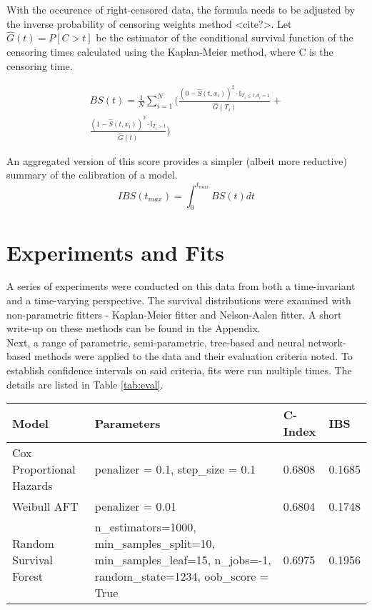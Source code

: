 \documentclass[%
 reprint,
 amsmath,amssymb,
 aps,
]{revtex4-2}
\begin{document}
With the occurence of right-censored data, the formula needs to be adjusted by the inverse probability of censoring weights method <cite?>. Let $\hat{G}(t) = P[C>t]$ be the estimator of the conditional survival function of the censoring times calculated using the Kaplan-Meier method, where C is the censoring time.

\begin{gather*}
BS(t) = \frac{1}{N}\sum^{N}_{i=1}\Bigg(\frac{(0-\hat{S}(t,x_i))^2 \cdot \mathbb{I}_{T_i\le t, d_i = 1}}{\hat{G}(T_i)} +\\
\frac{(1-\hat{S}(t,x_i))^2 \cdot \mathbb{I}_{T_i > t}}{\hat{G}(t)} \Bigg)
\end{gather*}

An aggregated version of this score provides a simpler (albeit more reductive) summary of the calibration of a model.
\[
IBS(t_{max})= \int^{t_{max}}_{0} BS(t) dt
\]

\section{\label{exp}Experiments and Fits}
A series of experiments were conducted on this data from both a time-invariant and a time-varying perspective. The  survival distributions were examined with non-parametric fitters - Kaplan-Meier fitter and Nelson-Aalen fitter. A short write-up on these methods can be found in the Appendix.\\

Next, a range of parametric, semi-parametric, tree-based and neural network-based methods were applied to the data and their evaluation criteria noted. To establish confidence intervals on said criteria, fits were run multiple times. The details are listed in Table \ref{tab:eval}.\\

\begin{table*}[t]
  \centering
  \begin{tabular}{|p{4cm}|p{6cm}|p{2cm}|p{2cm}|}
     \hline
    \textbf{Model} & \textbf{Parameters} & \textbf{C-Index} & \textbf{IBS} \\
    \hline
    Cox Proportional Hazards & penalizer = 0.1, step\_size = 0.1 & 0.6808 & 0.1685\\
    \hline
    Weibull AFT & penalizer = 0.01  & 0.6804 & 0.1748\\
    \hline
    Random Survival Forest & n\_estimators=1000, min\_samples\_split=10, min\_samples\_leaf=15, n\_jobs=-1, random\_state=1234, oob\_score = True  & 0.6975 & 0.1956\\
    \hline
  \end{tabular}
  \caption{Evaluation metrics}
  \label{tab:eval}
\end{table*}
\end{document}
